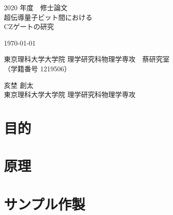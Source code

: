 \documentclass[uplatex,openany,oneside,a4j,11pt]{jsbook}
\begin{document}
\begin{titlepage}
    \begin{center}
        {\Large 2020 年度　修士論文}\\
        \vspace{180truept}
        {\Huge 超伝導量子ビット間における\\
        \vspace{10truept}
        CZゲートの研究}\\
        \vspace{70truept}

        {\Large \today}\\

        \vspace{70truept}

        {\Large 東京理科大学大学院 理学研究科物理学専攻　蔡研究室\\
        （学籍番号 1219506）}\\

        \vspace{20truept}

        {\huge 亥埜 創太}\\

        \vspace{160truept}
        {\Large 東京理科大学大学院 理学研究科物理学専攻}\\
    \end{center}
\end{titlepage}


\setcounter{tocdepth}{2}
\tableofcontents
\chapter{目的}
    \begin{abstract}
    \end{abstract}
    

    \chapter{原理}
    \begin{abstract}
    \end{abstract}
    

\chapter{サンプル作製}
    \begin{abstract}
    \end{abstract}
    
\end{document}
